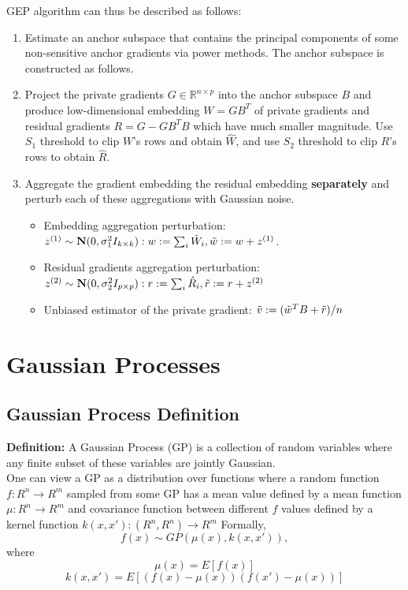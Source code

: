 \documentclass[fourier]{_style/dissertation}
\begin{document}
GEP algorithm can thus be described as follows: 
\begin{enumerate}
    \item Estimate an anchor subspace that contains the principal components of some non-sensitive anchor gradients via power methods. The anchor subspace is constructed as follows. 
    \item Project the private gradients $G \in \mathbb{R}^{n \times p}$ into the anchor subspace $B$ and produce low-dimensional embedding $W=GB^{T}$ of private gradients and  residual gradients  $R=G-GB^{T}B$ which have much smaller magnitude. Use $S_{1}$ threshold to clip $W$'s rows and obtain $\hat{W}$, and use $S_{2}$ threshold to clip $R$'s rows to obtain $\hat{R}$.
    \item Aggregate the gradient embedding the residual embedding \textbf{separately}  and perturb each of these aggregations with Gaussian noise.
    \begin{itemize}
        \item Embedding aggregation perturbation:  $z^{(1)} \sim \mathbf{N}(0, \sigma_{1}^{2}I_{k \times k}): w:=\sum_{i} \hat{W}_{i}, \Tilde{w}:=w+z^{(1)}$. 
        \item Residual gradients aggregation perturbation: $z^{(2)} \sim \mathbf{N}(0,\sigma_{2}^{2}I_{p \times p}): r:=\sum_{i} \hat{R}_{i}, \Tilde{r}:=r+z^{(2)}$
        \item Unbiased estimator of the private gradient: $\Tilde{v}:=(\Tilde{w}^{T}B+\Tilde{r})/n$
    \end{itemize}
    
    
\end{enumerate}

\section{Gaussian Processes}

\subsection{Gaussian Process Definition}
\textbf{Definition:} A Gaussian Process (GP) \cite{Rasmussen2006Gaussian2006} is a collection of random variables where any finite subset of these variables are jointly Gaussian. \\
One can view a GP as a distribution over functions where a random function $f:R^{n} \rightarrow R^{m}$ sampled from some GP has a mean value defined by a mean function $\mu: R^{n} \rightarrow R^{m}$ and covariance function between different $f$ values defined by a kernel function $k(x,x'): (R^{n}, R^{n}) \rightarrow R^{m} $ 
Formally,
$$f(x) \sim GP(\mu(x), k(x,x')),$$ where $$\mu(x)=E[f(x)]$$ $$k(x,x')=E[(f(x)-\mu(x))(f(x')-\mu(x))]$$ 
\end{document}
